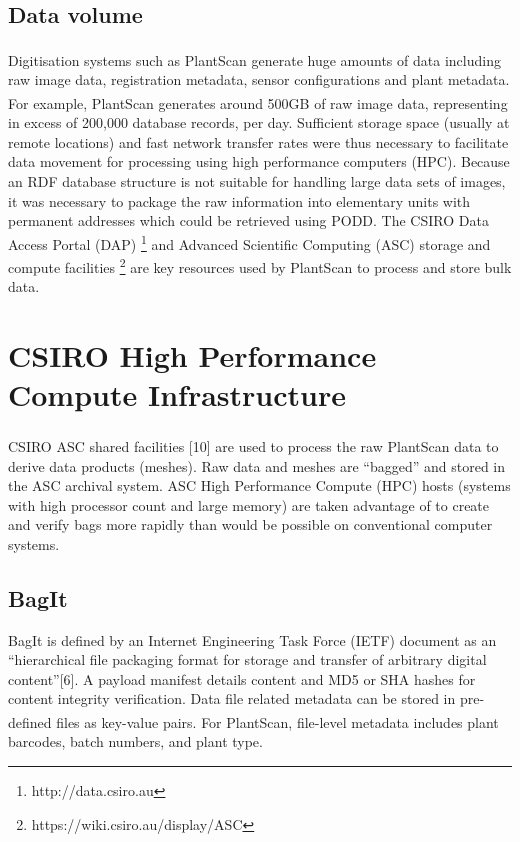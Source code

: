 \documentclass{llncs}
\begin{document}
\subsection{Data volume}
Digitisation systems such as PlantScan\textsuperscript{\texttrademark} generate huge amounts of data including
raw image data, registration metadata, sensor configurations and plant metadata.
For example, PlantScan\textsuperscript{\texttrademark} generates around 500GB of raw image data, representing
in excess of 200,000 database records, per day. Sufficient storage space
(usually at remote locations) and fast network transfer rates were thus
necessary to facilitate data movement for processing using high performance
computers (HPC). Because an RDF database structure is not suitable for handling
large data sets of images, it was necessary to package the raw information into
elementary units with permanent addresses which could be retrieved using PODD. 
The CSIRO Data Access Portal (DAP) \footnote{http://data.csiro.au} and Advanced
Scientific Computing (ASC) storage and compute facilities
\footnote{https://wiki.csiro.au/display/ASC} are key resources used by PlantScan\textsuperscript{\texttrademark} to
process and store bulk data.


\section{CSIRO High Performance Compute Infrastructure}
CSIRO ASC shared facilities [10] are used to process the raw PlantScan\textsuperscript{\texttrademark} data to
derive data products (meshes). Raw data and meshes are ``bagged'' and stored in
the ASC archival system. ASC High Performance Compute (HPC) hosts (systems with
high processor count and large memory) are taken advantage of to create and
verify bags more rapidly than would be possible on conventional computer
systems.

\subsection{BagIt}

BagIt is defined by an Internet Engineering Task Force (IETF) document as an
``hierarchical file packaging format for storage and transfer of arbitrary
digital content''[6]. A payload manifest details content and MD5 or SHA hashes
for content integrity verification. Data file related metadata can be stored in
pre-defined files as key-value pairs. For PlantScan\textsuperscript{\texttrademark}, file-level metadata
includes plant barcodes, batch numbers, and plant type.
\end{document}
